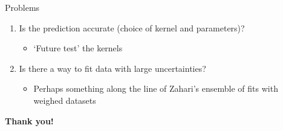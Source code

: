 \documentclass[aspectratio=169,11pt]{beamer}
\begin{document}
\begin{frame}[t]{Problems}
  \begin{enumerate}
    \item Is the prediction accurate (choice of kernel and parameters)?
    \begin{itemize}
      \item `Future test' the kernels
    \end{itemize}
    \item Is there a way to fit data with large uncertainties?
    \begin{itemize}
      \item Perhaps something along the line of Zahari's ensemble of fits with weighed datasets
    \end{itemize}
  \end{enumerate}
\end{frame}



\bgroup
  \begin{frame}{}
    \color{white}
    \huge
    \begin{center}
      \textbf{Thank you!}
    \end{center}
  \end{frame}
\egroup


% 
\end{document}

